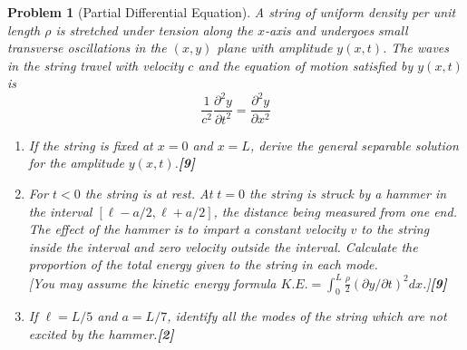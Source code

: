 \documentclass[a4paper]{article}
\theoremstyle{new}
\newtheorem{qns}{Problem}[section]
\begin{document}
\begin{qns}[Partial Differential Equation]
A string of uniform density per unit length $\rho$ is stretched under tension along the $x$-axis and undergoes small transverse oscillations in the $(x, y)$ plane with amplitude $y(x, t)$. The waves in the string travel with velocity $c$ and the equation of motion satisfied by $y(x, t)$ is
$$\frac{1}{c^2}\frac{\partial^2y}{\partial t^2}=\frac{\partial^2y}{\partial x^2}$$
\begin{enumerate}[label=(\alph*)]
\item If the string is fixed at $x = 0$ and $x = L$, derive the general separable solution for the amplitude $y(x, t)$.\hfill\textbf{[9]}
\item For $t < 0$ the string is at rest. At $t = 0$ the string is struck by a hammer in the interval $[\ell-a/2,\ell+a/2]$, the distance being measured from one end. The effect of the hammer is to impart a constant velocity $v$ to the string inside the interval and zero velocity outside the interval. Calculate the proportion of the total energy given to the string in each mode.\\[5pt]
[You may assume the kinetic energy formula $K.E.=\int_0^L\frac{\rho}{2}(\partial y/\partial t)^2dx$.]\hfill\textbf{[9]}
\item If $\ell=L/5$ and $a = L/7$, identify all the modes of the string which are not excited by the hammer.\hfill\textbf{[2]}
\end{enumerate}
\end{qns}
\end{document}
